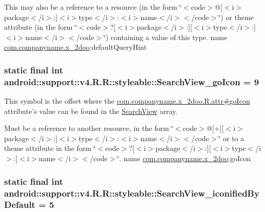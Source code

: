 This may also be a reference to a resource (in the form \char`\"{}$<$code$>$@\mbox{[}$<$i$>$package$<$/i$>$:\mbox{]}$<$i$>$type$<$/i$>$:$<$i$>$name$<$/i$>$$<$/code$>$\char`\"{}) or theme attribute (in the form \char`\"{}$<$code$>$?\mbox{[}$<$i$>$package$<$/i$>$:\mbox{]}\mbox{[}$<$i$>$type$<$/i$>$:\mbox{]}$<$i$>$name$<$/i$>$$<$/code$>$\char`\"{}) containing a value of this type.  name \hyperlink{namespacecom_1_1companyname_1_1x__2doo}{com.companyname.x\_\-2doo}:defaultQueryHint \hypertarget{classandroid_1_1support_1_1v4_1_1_r_1_1styleable_90f7086fb0866e78b77259eb32289c59}{
\subsubsection[{SearchView\_\-goIcon}]{\setlength{\rightskip}{0pt plus 5cm}static final int android::support::v4.R.R::styleable::SearchView\_\-goIcon = 9}}
\label{classandroid_1_1support_1_1v4_1_1_r_1_1styleable_90f7086fb0866e78b77259eb32289c59}


This symbol is the offset where the \hyperlink{classcom_1_1companyname_1_1x__2doo_1_1_r_1_1attr_a6435fee6878633e545bfd9b0b98340f}{com.companyname.x\_\-2doo.R.attr\#goIcon} attribute's value can be found in the \hyperlink{classandroid_1_1support_1_1v4_1_1_r_1_1styleable_63a589da97c59fb7eebd9759edb31f0d}{SearchView} array.

Must be a reference to another resource, in the form \char`\"{}$<$code$>$@\mbox{[}+\mbox{]}\mbox{[}$<$i$>$package$<$/i$>$:\mbox{]}$<$i$>$type$<$/i$>$:$<$i$>$name$<$/i$>$$<$/code$>$\char`\"{} or to a theme attribute in the form \char`\"{}$<$code$>$?\mbox{[}$<$i$>$package$<$/i$>$:\mbox{]}\mbox{[}$<$i$>$type$<$/i$>$:\mbox{]}$<$i$>$name$<$/i$>$$<$/code$>$\char`\"{}.  name \hyperlink{namespacecom_1_1companyname_1_1x__2doo}{com.companyname.x\_\-2doo}:goIcon \hypertarget{classandroid_1_1support_1_1v4_1_1_r_1_1styleable_082b54398657d1cdbea56322bf7c5e7f}{
\subsubsection[{SearchView\_\-iconifiedByDefault}]{\setlength{\rightskip}{0pt plus 5cm}static final int android::support::v4.R.R::styleable::SearchView\_\-iconifiedByDefault = 5}}
\label{classandroid_1_1support_1_1v4_1_1_r_1_1styleable_082b54398657d1cdbea56322bf7c5e7f}



